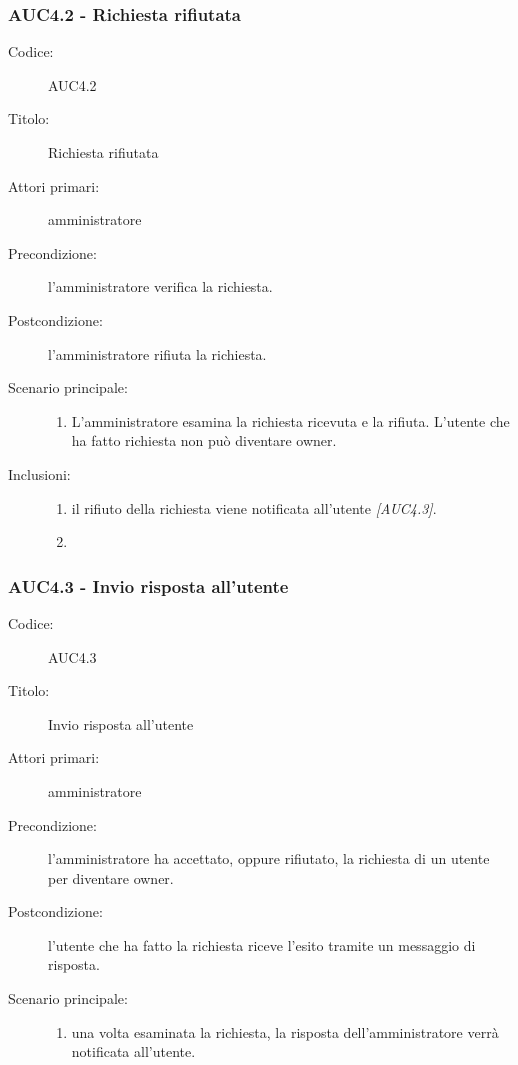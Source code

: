 \documentclass[../../../analisi-dei-requisiti.tex]{subfiles}
\begin{document}
\subsubsection{AUC4.2 - Richiesta rifiutata}%
\label{subs:AUC4.2}

\begin{description}
  \item[Codice:] AUC4.2
  \item[Titolo:] Richiesta rifiutata
  \item[Attori primari:] amministratore
  \item[Precondizione:] l'amministratore verifica la richiesta.
  \item[Postcondizione:] l'amministratore rifiuta la richiesta.
  \item[Scenario principale:]
  \begin{enumerate}
    \item L'amministratore esamina la richiesta ricevuta e la rifiuta. L'utente che ha fatto richiesta non può diventare owner.
  \end{enumerate}
  \item[Inclusioni:]
  \begin{enumerate}
    \item il rifiuto della richiesta viene notificata all'utente \emph{[AUC4.3]}.
    \item
  \end{enumerate}
\end{description}

\subsubsection{AUC4.3 - Invio risposta all'utente}%
\label{subs:AUC4.3}

\begin{description}
  \item[Codice:] AUC4.3
  \item[Titolo:] Invio risposta all'utente
  \item[Attori primari:] amministratore
  \item[Precondizione:] l'amministratore ha accettato, oppure rifiutato, la richiesta di un utente per diventare owner.
  \item[Postcondizione:] l'utente che ha fatto la richiesta riceve l'esito tramite un messaggio di risposta.
  \item[Scenario principale:]
  \begin{enumerate}
    \item una volta esaminata la richiesta, la risposta dell'amministratore verrà notificata all'utente.
  \end{enumerate}
\end{description}
\end{document}

